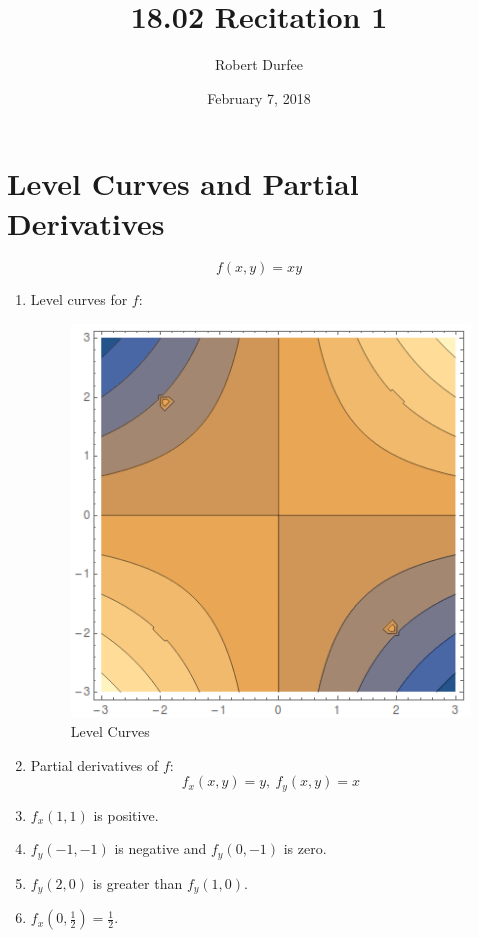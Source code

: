 \documentclass{article}
\title{ 18.02 Recitation 1 }
\author{ Robert Durfee }
\date{ February 7, 2018 }
\begin{document}
\maketitle

\section{ Level Curves and Partial Derivatives }
$$ f(x, y) = xy $$

\begin{enumerate}[1.]
  \item Level curves for $f$:

    \begin{figure}[H]
      \centering
      \includegraphics[scale=0.50]{"LevelCurves"}
      \caption{Level Curves}
    \end{figure}

  \item Partial derivatives of $f$:
    $$ f_{x}(x, y) = y,\ f_{y}(x, y) = x $$

  \item $f_{x}(1, 1)$ is positive.

  \item $f_{y}(-1, -1)$ is negative and $f_{y}(0, -1)$ is zero.

  \item $f_{y}(2,0)$ is greater than $f_{y}(1,0)$.

  \item $f_{x}\left( 0, \frac{ 1 }{ 2 } \right) = \frac{ 1 }{ 2 }$.


\end{enumerate}
\end{document}
